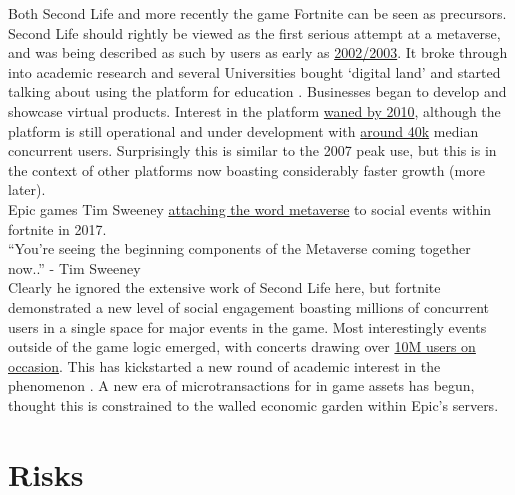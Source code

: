 Both Second Life and more recently the game Fortnite can be seen as precursors. Second Life should rightly be viewed as the first serious attempt at a metaverse, and was being described as such by users as early as \href{https://nwn.blogs.com/nwn/2003/06/the_early_creat.html}{2002/2003}. It broke through into academic research and several Universities bought `digital land' and started talking about using the platform for education \cite{sermon2008they, emp2006putting, kirriemuir2008spring, sant2009performance}. Businesses began to develop and showcase virtual products. Interest in the platform \href{https://trends.google.com/trends/explore?date=all&q=second\%20life}{waned by 2010}, although the platform is still operational and under development with \href{https://danielvoyager.wordpress.com/category/second-life-stats/}{around 40k} median concurrent users. Surprisingly this is similar to the 2007 peak use, but this is in the context of other platforms now boasting considerably faster growth (more later).\\
Epic games Tim Sweeney \href{https://venturebeat.com/2017/05/15/epic-games-tim-sweeney-fears-the-metaverse-will-be-a-proprietary-technology/}{attaching the word metaverse} to social events within fortnite in 2017.\\
``You’re seeing the beginning components of the Metaverse coming together now..'' - Tim Sweeney\\
Clearly he ignored the extensive work of Second Life here, but fortnite demonstrated a new level of social engagement boasting millions of concurrent users in a single space for major events in the game. Most interestingly events outside of the game logic emerged, with concerts drawing over \href{https://www.epicgames.com/fortnite/en-US/news/astronomical}{10M users on occasion}. This has kickstarted a new round of academic interest in the phenomenon \cite{marlatt2020capitalizing}. A new era of microtransactions for in game assets has begun, thought this is constrained to the walled economic garden within Epic's servers.
              \section{Risks}
